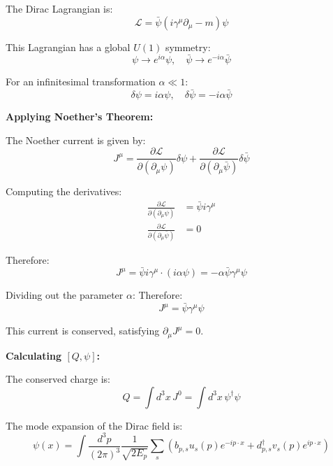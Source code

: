 \documentclass[12pt]{article}
\begin{document}
The Dirac Lagrangian is:
\begin{equation}
\mathcal{L} = \bar{\psi}(i\gamma^\mu \partial_\mu - m)\psi
\end{equation}

This Lagrangian has a global $U(1)$ symmetry:
\begin{equation}
\psi \to e^{i\alpha}\psi, \quad \bar{\psi} \to e^{-i\alpha}\bar{\psi}
\end{equation}

For an infinitesimal transformation $\alpha \ll 1$:
\begin{equation}
\delta\psi = i\alpha\psi, \quad \delta\bar{\psi} = -i\alpha\bar{\psi}
\end{equation}

\textbf{Applying Noether's Theorem:}

The Noether current is given by:
\begin{equation}
J^\mu = \frac{\partial \mathcal{L}}{\partial(\partial_\mu \psi)} \delta\psi + \frac{\partial \mathcal{L}}{\partial(\partial_\mu \bar{\psi})} \delta\bar{\psi}
\end{equation}

Computing the derivatives:
\begin{align}
\frac{\partial \mathcal{L}}{\partial(\partial_\mu \psi)} &= \bar{\psi} i\gamma^\mu \\
\frac{\partial \mathcal{L}}{\partial(\partial_\mu \bar{\psi})} &= 0
\end{align}

Therefore:
\begin{equation}
J^\mu = \bar{\psi} i\gamma^\mu \cdot (i\alpha\psi) = -\alpha \bar{\psi}\gamma^\mu\psi
\end{equation}

Dividing out the parameter $\alpha$:
Therefore:
\begin{equation}
J^\mu = \bar{\psi}\gamma^\mu\psi
\end{equation}

This current is conserved, satisfying $\partial_\mu J^\mu = 0$.

\textbf{Calculating $[Q, \psi]$:}

The conserved charge is:
\begin{equation}
Q = \int d^3x \, J^0 = \int d^3x \, \psi^\dagger \psi
\end{equation}

The mode expansion of the Dirac field is:
\begin{equation}
\psi(x) = \int \frac{d^3p}{(2\pi)^3} \frac{1}{\sqrt{2E_p}} \sum_{s} \left( b_{p,s} u_s(p) e^{-ip\cdot x} + d_{p,s}^\dagger v_s(p) e^{ip\cdot x} \right)
\end{equation}
\end{document}
